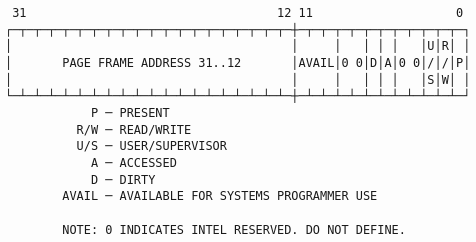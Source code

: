 \documentclass[varwidth=25cm,crop]{standalone}
\begin{document}
\begin{verbatim}
 31                                   12 11                    0
┌─┬─┬─┬─┬─┬─┬─┬─┬─┬─┬─┬─┬─┬─┬─┬─┬─┬─┬─┬─┼─┬─┬─┬─┬─┬─┬─┬─┬─┬─┬─┬─┐
│                                       │     │   │ │ │   │U│R│ │
│       PAGE FRAME ADDRESS 31..12       │AVAIL│0 0│D│A│0 0│/│/│P│
│                                       │     │   │ │ │   │S│W│ │
└─┴─┴─┴─┴─┴─┴─┴─┴─┴─┴─┴─┴─┴─┴─┴─┴─┴─┴─┴─┼─┴─┴─┴─┴─┴─┴─┴─┴─┴─┴─┴─┘
            P ─ PRESENT
          R/W ─ READ/WRITE
          U/S ─ USER/SUPERVISOR
            A ─ ACCESSED
            D ─ DIRTY
        AVAIL ─ AVAILABLE FOR SYSTEMS PROGRAMMER USE

        NOTE: 0 INDICATES INTEL RESERVED. DO NOT DEFINE.
\end{verbatim}
\end{document}
